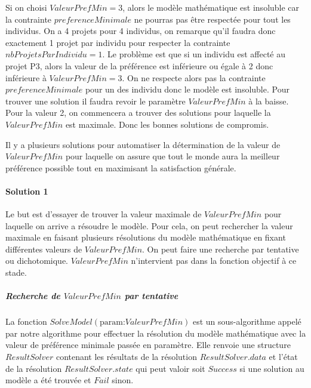 \documentclass[final,poster]{polytech/polytech}
\begin{document}
Si on choisi $ValeurPrefMin=3$, alors le modèle mathématique est insoluble car la contrainte $preferenceMinimale$ ne pourras pas être respectée pour tout les individus. On a 4 projets pour 4 individus, on remarque qu'il faudra donc exactement 1 projet par individu pour respecter la contrainte $nbProjetsParIndividu=1$. Le problème est que si un individu est affecté au projet P3, alors la valeur de la préférence est inférieure ou égale à 2 donc inférieure à $ValeurPrefMin=3$. On ne respecte alors pas la contrainte $preferenceMinimale$ pour un des individu donc le modèle est insoluble.
Pour trouver une solution il faudra revoir le paramètre $ValeurPrefMin$ à la baisse. Pour la valeur 2, on commencera a trouver des solutions pour laquelle la $ValeurPrefMin$ est maximale. Donc les bonnes solutions de compromis.

Il y a plusieurs solutions pour automatiser la détermination de la valeur de $ValeurPrefMin$ pour laquelle on assure que tout le monde aura la meilleur préférence possible tout en maximisant la satisfaction générale.

\paragraph{Solution 1}
Le but est d'essayer de trouver la valeur maximale de $ValeurPrefMin$ pour laquelle on arrive a résoudre le modèle. Pour cela, on peut rechercher la valeur maximale en faisant plusieurs résolutions du modèle mathématique en fixant différentes valeurs de $ValeurPrefMin$. On peut faire une recherche par tentative ou dichotomique. $ValeurPrefMin$ n'intervient pas dans la fonction objectif à ce stade.

\subparagraph{Recherche de $ValeurPrefMin$ par tentative}

La fonction $SolveModel(\text{param:} ValeurPrefMin)$ est un sous-algorithme appelé par notre algorithme pour effectuer la résolution du modèle mathématique avec la valeur de préférence minimale passée en paramètre.
Elle renvoie une structure $ResultSolver$ contenant les résultats de la résolution $ResultSolver.data$ et l'état de la résolution $ResultSolver.state$ qui peut valoir soit $Success$ si une solution au modèle a été trouvée et $Fail$ sinon.
\end{document}
